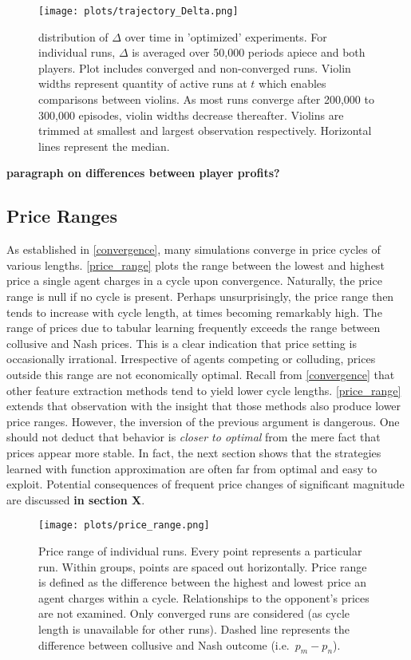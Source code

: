 \begin{figure}
	\texttt{[image: plots/trajectory\_Delta.png]}
	\caption{distribution of $\Delta$ over time in 'optimized' experiments. For individual runs, $\Delta$ is averaged over 50,000 periods apiece and both players. Plot includes converged and non-converged runs. Violin widths represent quantity of active runs at $t$ which enables comparisons between violins. As most runs converge after 200,000 to 300,000 episodes, violin widths decrease thereafter. Violins are trimmed at smallest and largest observation respectively. Horizontal lines represent the median.}
	\label{trajectory_Delta}
\end{figure}

\textbf{paragraph on differences between player profits?}

\subsection{Price Ranges}\label{prices}

As established in \autoref{convergence}, many simulations converge in price cycles of various lengths. \autoref{price_range} plots the range between the lowest and highest price a single agent charges in a cycle upon convergence. Naturally, the price range is null if no cycle is present. Perhaps unsurprisingly, the price range then tends to increase with cycle length, at times becoming remarkably high. The range of prices due to tabular learning frequently exceeds the range between collusive and Nash prices. This is a clear indication that price setting is occasionally irrational. Irrespective of agents competing or colluding, prices outside this range are not economically optimal. Recall from \autoref{convergence} that other feature extraction methods tend to yield lower cycle lengths. \autoref{price_range} extends that observation with the insight that those methods also produce lower price ranges. However, the inversion of the previous argument is dangerous. One should not deduct that behavior is \emph{closer to optimal} from the mere fact that prices appear more stable. In fact, the next section shows that the strategies learned with function approximation are often far from optimal and easy to exploit. Potential consequences of frequent price changes of significant magnitude are discussed \textbf{in section X}.

\begin{figure}
	\texttt{[image: plots/price\_range.png]}
	\caption{Price range of individual runs. Every point represents a particular run. Within groups, points are spaced out horizontally. Price range is defined as the difference between the highest and lowest price an agent charges within a cycle. Relationships to the opponent's prices are not examined. Only converged runs are considered (as cycle length is unavailable for other runs). Dashed line represents the difference between collusive and Nash outcome (i.e.\ $p_m - p_n$).}
	\label{price_range}
\end{figure}


